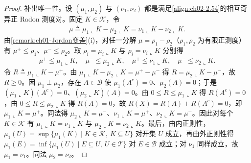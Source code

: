 \documentclass[../../main.tex]{subfiles}%
\begin{document}
\begin{proof}
补出唯一性。设 $(\mu_1,\mu_2)$ 与 $(\nu_1,\nu_2)$ 都是满足\eqref{align:ch02-2.54}的相互奇异正 Radon 测度对。固定 $K\in\mathscr K$，令
\begin{align*}
\mu\triangleq \mu_1\llcorner K-\mu_2\llcorner K=\nu_1\llcorner K-\nu_2\llcorner K.
\end{align*}
由\cref{remark:ch01-Jordan变差}(i)，对任一分解 $\mu=\rho_1-\rho_2$（$\rho_1,\rho_2$ 为有限正测度）有 $\mu^+\leqslant\rho_1$、$\mu^-\leqslant\rho_2$。取 $\rho_i=\mu_i\llcorner K$ 与 $\rho_i=\nu_i\llcorner K$ 分别得
\begin{align*}
\mu^+\leqslant\mu_1\llcorner K,\quad\mu^-\leqslant\mu_2\llcorner K,\quad
\mu^+\leqslant\nu_1\llcorner K,\quad\mu^-\leqslant\nu_2\llcorner K.
\end{align*}
令 $R\triangleq\mu_1\llcorner K-\mu^+$。由 $\mu_1\llcorner K-\mu_2\llcorner K=\mu^+-\mu^-$ 得 $R=\mu_2\llcorner K-\mu^-$，故 $R\geqslant0$。因 $\mu_1\perp\mu_2$，存在 $A\in\mathscr B$ 使 $\mu_1(A^c)=0$、$\mu_2(A)=0$；于是 $(\mu_1\llcorner K)(A^c)=0$、$(\mu_2\llcorner K)(A)=0$。由 $0\leqslant R\leqslant\mu_1\llcorner K$ 得 $R(A^c)=0$，由 $0\leqslant R\leqslant\mu_2\llcorner K$ 得 $R(A)=0$，故 $R(X)=R(A)+R(A^c)=0$，即 $\mu_1\llcorner K=\mu^+$。同法得 $\mu_2\llcorner K=\mu^-$、$\nu_1\llcorner K=\mu^+$、$\nu_2\llcorner K=\mu^-$。因此对每个 $K\in\mathscr K$ 有 $\mu_1\llcorner K=\nu_1\llcorner K$ 与 $\mu_2\llcorner K=\nu_2\llcorner K$。最后，由内正则性，$\mu_1(U)=\sup\{\mu_1(K)\mid K\in\mathscr K,\ K\subseteq U\}$ 对开集 $U$ 成立，再由外正则性得 $\mu_1(E)=\inf\{\mu_1(U)\mid E\subseteq U,\ U\in\mathscr T\}$ 对 $E\in\mathscr B$ 成立；对 $\nu_1$ 同样成立，故 $\mu_1=\nu_1$。同法 $\mu_2=\nu_2$。
\end{proof}
\end{document}
